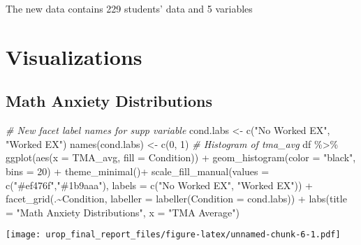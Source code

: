 \documentclass[
]{article}
\newenvironment{Shaded}{\begin{snugshade}}{\end{snugshade}}
\newcommand{\AttributeTok}[1]{\textcolor[rgb]{0.77,0.63,0.00}{#1}}
\newcommand{\CommentTok}[1]{\textcolor[rgb]{0.56,0.35,0.01}{\textit{#1}}}
\newcommand{\DecValTok}[1]{\textcolor[rgb]{0.00,0.00,0.81}{#1}}
\newcommand{\FunctionTok}[1]{\textcolor[rgb]{0.00,0.00,0.00}{#1}}
\newcommand{\NormalTok}[1]{#1}
\newcommand{\OtherTok}[1]{\textcolor[rgb]{0.56,0.35,0.01}{#1}}
\newcommand{\SpecialCharTok}[1]{\textcolor[rgb]{0.00,0.00,0.00}{#1}}
\newcommand{\StringTok}[1]{\textcolor[rgb]{0.31,0.60,0.02}{#1}}
\begin{document}
The new data contains 229 students' data and 5 variables

\hypertarget{visualizations}{%
\section{Visualizations}\label{visualizations}}

\hypertarget{math-anxiety-distributions}{%
\subsection{Math Anxiety
Distributions}\label{math-anxiety-distributions}}

\begin{Shaded}
\begin{Highlighting}[]
\CommentTok{\# New facet label names for supp variable}
\NormalTok{cond.labs }\OtherTok{\textless{}{-}} \FunctionTok{c}\NormalTok{(}\StringTok{"No Worked EX"}\NormalTok{, }\StringTok{"Worked EX"}\NormalTok{)}
\FunctionTok{names}\NormalTok{(cond.labs) }\OtherTok{\textless{}{-}} \FunctionTok{c}\NormalTok{(}\DecValTok{0}\NormalTok{, }\DecValTok{1}\NormalTok{)}
\CommentTok{\# Histogram of tma\_avg }
\NormalTok{df }\SpecialCharTok{\%\textgreater{}\%} 
  \FunctionTok{ggplot}\NormalTok{(}\FunctionTok{aes}\NormalTok{(}\AttributeTok{x =}\NormalTok{ TMA\_avg, }\AttributeTok{fill =}\NormalTok{ Condition)) }\SpecialCharTok{+} 
  \FunctionTok{geom\_histogram}\NormalTok{(}\AttributeTok{color =} \StringTok{"black"}\NormalTok{, }\AttributeTok{bins =} \DecValTok{20}\NormalTok{) }\SpecialCharTok{+}
  \FunctionTok{theme\_minimal}\NormalTok{()}\SpecialCharTok{+} 
  \FunctionTok{scale\_fill\_manual}\NormalTok{(}\AttributeTok{values =} \FunctionTok{c}\NormalTok{(}\StringTok{"\#ef476f"}\NormalTok{,}\StringTok{"\#1b9aaa"}\NormalTok{), }\AttributeTok{labels =} \FunctionTok{c}\NormalTok{(}\StringTok{"No Worked EX"}\NormalTok{, }\StringTok{"Worked EX"}\NormalTok{)) }\SpecialCharTok{+}
  \FunctionTok{facet\_grid}\NormalTok{(.}\SpecialCharTok{\textasciitilde{}}\NormalTok{Condition, }\AttributeTok{labeller =} \FunctionTok{labeller}\NormalTok{(}\AttributeTok{Condition =}\NormalTok{ cond.labs))  }\SpecialCharTok{+}
  \FunctionTok{labs}\NormalTok{(}\AttributeTok{title =} \StringTok{"Math Anxiety Distributions"}\NormalTok{, }\AttributeTok{x =} \StringTok{"TMA Average"}\NormalTok{)}
\end{Highlighting}
\end{Shaded}

\texttt{[image: urop\_final\_report\_files/figure-latex/unnamed-chunk-6-1.pdf]}
\end{document}

